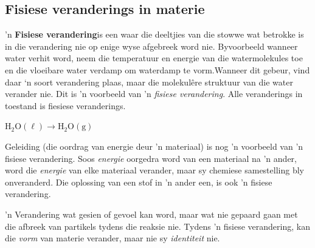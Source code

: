             \subsection*{Fisiese veranderings in materie}
            \nopagebreak
      \label{m38709*id62200}'n \textbf{Fisiese verandering}is een waar die deeltjies van die stowwe wat betrokke is in die verandering
nie op enige wyse afgebreek word nie. Byvoorbeeld wanneer water verhit word, neem die temperatuur en energie van
die watermolekules toe en die vloeibare water verdamp om waterdamp te vorm.Wanneer dit gebeur, vind daar ‘n soort
verandering plaas, maar die molekulêre struktuur van die water verander nie. Dit is 'n voorbeeld van 'n \textsl{fisiese verandering}. Alle veranderings in toestand is fiesiese veranderings. \par 
      \label{m38709*id62556}$\text{H}{}_{2}\text{O}\left( \ell \right)\to \text{H}{}_{2}\text{O}\left(\text{g}\right)$
      \par 
      \label{m38709*id62600}Geleiding (die oordrag van energie deur 'n materiaal) is nog 'n voorbeeld van 'n fisiese verandering. Soos \textsl{energie} oorgedra word van een materiaal na 'n ander, word die \textsl{energie} van elke materiaal verander, maar sy chemiese samestelling bly onveranderd. Die oplossing van een stof in 'n ander een, is ook 'n fisiese verandering.\par 
\label{m38709*fhsst!!!underscore!!!id76}
  { \label{m38709*meaningfhsst!!!underscore!!!id76}
      'n Verandering wat gesien of gevoel kan word, maar wat nie gepaard gaan met die afbreek van partikels tydens die
reaksie nie. Tydens 'n fisiese verandering, kan die \textsl{vorm} van materie verander, maar nie sy \textsl{identiteit} nie. 
       } 

